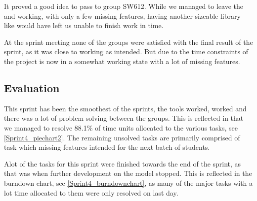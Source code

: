 It proved a good idea to pass  to group SW612. While we
managed to leave the  and  working, with
only a few missing features, having another sizeable library like
 would have left us unable to finish work in time.\nl

At the sprint meeting none of the groups were satisfied with the final result of
the sprint, as it was close to working as intended. But due to the time
constraints of the project is now in a somewhat working state with a lot of
missing features.\nl

\subsection{Evaluation}

This sprint has been the smoothest of the sprints, the tools worked,
 worked and there was a lot of problem solving between the groups.
This is reflected in that we managed to resolve 88.1\% of time units allocated
to the various tasks, see \autoref{Sprint4_piechart2}. The remaining unsolved
tasks are primarily comprised of task which missing features intended for the
next batch of students.


Alot of the tasks for this sprint were finished towards the end of the sprint,
as that was when further development on the  model stopped. This is
reflected in the burndown chart, see \autoref{Sprint4_burndownchart}, as many of
the major tasks with a lot time allocated to them were only resolved on last
day.


